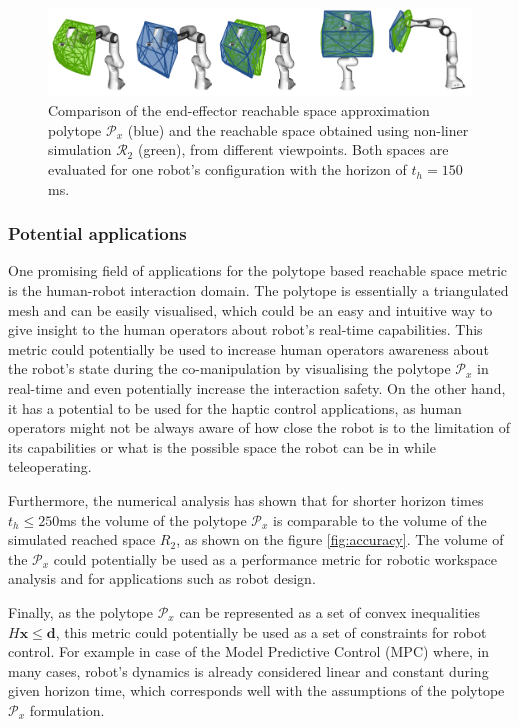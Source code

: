 \begin{figure}[!t]
    \centering
    \includegraphics[width=\textwidth]{Papers/images/c3.png}
    \caption{Comparison of the end-effector reachable space approximation polytope $\mathcal{P}_x$ (blue) and the reachable space obtained using non-liner simulation $\mathcal{R}_2$ (green), from different viewpoints. Both spaces are evaluated for one robot's configuration with the horizon of $t_h=150$ms. }
    \label{fig:comparisson_simu_convex}
\end{figure}

\subsubsection{Potential applications}

One promising field of applications for the polytope based reachable space metric is the human-robot interaction domain. The polytope is essentially a triangulated mesh and can be easily visualised, which could be an easy and intuitive way to give insight to the human operators about robot's real-time capabilities. This metric could potentially be used to increase human operators awareness about the robot's state during the co-manipulation by visualising the polytope $\mathcal{P}_x$ in real-time and even potentially increase the interaction safety. On the other hand, it has a potential to be used for the haptic control applications, as human operators might not be always aware of how close the robot is to the limitation of its capabilities or what is the possible space the robot can be in while teleoperating. 

Furthermore, the numerical analysis has shown that for shorter horizon times $t_h\leq250$ms the volume of the polytope $\mathcal{P}_x$ is comparable to the volume of the simulated reached space $R_2$, as shown on the figure \ref{fig:accuracy}. The volume of the $\mathcal{P}_x$ could potentially be used as a performance metric for robotic workspace analysis and for applications such as robot design.

Finally, as the polytope $\mathcal{P}_x$ can be represented as a set of convex inequalities $H\bm{x}\leq\bm{d}$, this metric could potentially be used as a set of constraints for robot control. For example in case of the Model Predictive Control (MPC) where, in many cases, robot's dynamics is already considered linear and constant during given horizon time, which corresponds well with the assumptions of the polytope $\mathcal{P}_x$ formulation. 

